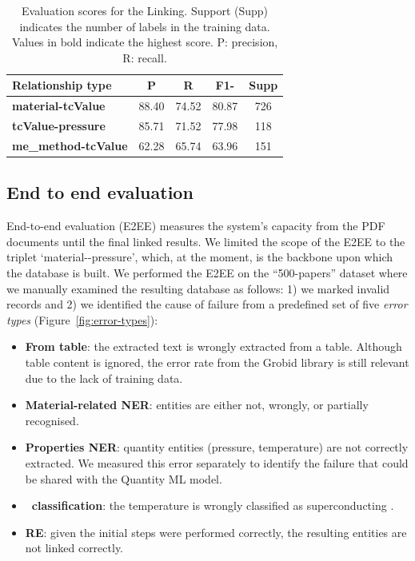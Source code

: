 \begin{table}[htbp]
    \centering
    \caption{Evaluation scores for the Linking. Support (Supp) indicates the number of labels in the training data. Values in bold indicate the highest score. P: precision, R: recall.}
    \begin{tabular}{lcccc}
        \toprule
        \textbf{Relationship type}          & \textbf{P} & \textbf{R} & \textbf{F1-} & Supp \\
        \midrule
        \textbf{material-tcValue}   & 88.40              & 74.52           & 80.87             & 726     \\
        \textbf{tcValue-pressure}   & 85.71              & 71.52           & 77.98             & 118     \\
        \textbf{me\_method-tcValue} & 62.28              & 65.74           & 63.96             & 151     \\
        \bottomrule
    \end{tabular}

    \label{table:evaluation-linking}
\end{table}



\subsection{End to end evaluation}
\label{sec:end2end}
End-to-end evaluation (E2EE) measures the system's capacity from the PDF documents until the final linked results.
We limited the scope of the E2EE to the triplet `material-\tc-pressure', which, at the moment, is the backbone upon which the database is built.
We performed the E2EE on the ``500-papers'' dataset where we manually examined the resulting database as follows: 1) we marked invalid records and 2) we identified the cause of failure from a predefined set of five \textit{error types} (Figure~\ref{fig:error-types}):
\begin{itemize}
    \item \textbf{From table}: the extracted text is wrongly extracted from a table. Although table content is ignored, the error rate from the Grobid library is still relevant due to the lack of training data.
    \item \textbf{Material-related NER}: entities are either not, wrongly, or partially recognised.
    \item \textbf{Properties NER}: quantity entities (pressure, temperature) are not correctly extracted. We measured this error separately to identify the failure that could be shared with the Quantity ML model.
    \item \textbf{\tc~classification}: the temperature is wrongly classified as superconducting \tc.
    \item \textbf{RE}: given the initial steps were performed correctly, the resulting entities are not linked correctly.
\end{itemize}


